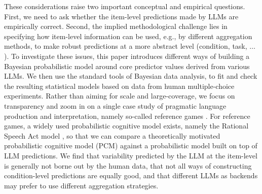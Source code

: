 \documentclass[fleqn]{article}
\begin{document}
These considerations raise two important conceptual and empirical questions.
First, we need to ask whether the item-level predictions made by LLMs are empirically correct.
Second, the implied methodological challenge lies in specifying how item-level information can be used, e.g., by different aggregation methods, to make robust predictions at a more abstract level (condition, task, $\dots$).
To investigate these issues, this paper introduces different ways of building a Bayesian probabilistic model around core predictor values derived from various LLMs.
We then use the standard tools of Bayesian data analysis, to fit and check the resulting statistical models based on data from human multiple-choice experiments.
Rather than aiming for scale and large-coverage, we focus on transparency and zoom in on a single case study of pragmatic language production and interpretation, namely so-called reference games \citep[e.g.,][]{DeemterSluis2006:Building-a-Sema,DegenFranke2013:Cost-Based-Prag,QingFranke2013:Variations-on-a,Frank2016:Rational-speech,GrafDegen2016:Animal-dog-or-d,SikosVenhuizen2021:Reevaluating-pr}.
For reference games, a widely used probabilistic cognitive model exists, namely the Rational Speech Act model \citep{FrankGoodman2012:Predicting-Prag}, so that we can compare a theoretically motivated probabilistic cognitive model (PCM) against a probabilistic model built on top of LLM predictions.
We find that variability predicted by the LLM at the item-level is generally not borne out by the human data, that not all ways of constructing condition-level predictions are equally good, and that different LLMs as backends may prefer to use different aggregation strategies.

\end{document}
